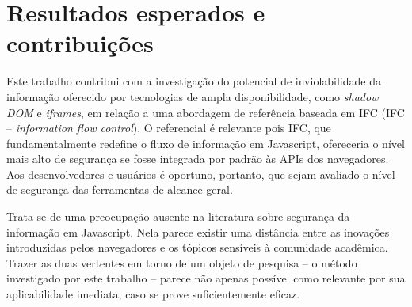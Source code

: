 \section{Resultados esperados e contribuições}


Este trabalho contribui com a investigação do potencial de inviolabilidade da informação oferecido por tecnologias de ampla disponibilidade, como \textit{shadow DOM} e \textit{iframes}, em relação a uma abordagem de referência baseada em IFC (IFC -- \textit{information flow control}). O referencial é relevante pois IFC, que fundamentalmente redefine o fluxo de informação em Javascript, ofereceria o nível mais alto de segurança se fosse integrada por padrão às APIs dos navegadores. Aos desenvolvedores e usuários é oportuno, portanto, que sejam avaliado o nível de segurança das ferramentas de alcance geral.

Trata-se de uma preocupação ausente na literatura sobre segurança da informação em Javascript. Nela parece existir uma distância entre as inovações introduzidas pelos navegadores e os tópicos sensíveis à comunidade acadêmica. Trazer as duas vertentes em torno de um objeto de pesquisa -- o método investigado por este trabalho -- parece não apenas possível como relevante por sua aplicabilidade imediata, caso se prove suficientemente eficaz.
